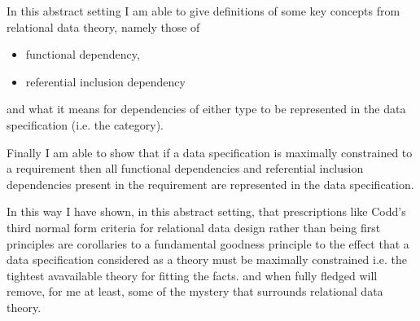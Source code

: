 \documentclass[10pt,a4paper]{article}
\theoremstyle{remark}
\begin{document}
In this abstract setting I am able to give definitions of some key concepts from relational data theory, namely
those of
\begin{itemize}
\item functional dependency,
\item referential inclusion dependency
\end{itemize}
and what it means for dependencies of either type to be represented in the data specification (i.e. the category).

Finally I am able to show that if a data specification is maximally constrained to a requirement then
all functional dependencies and referential inclusion dependencies present in the requirement are represented in the data
specification.

In this way I have shown,  in this abstract setting, that prescriptions like Codd's third normal form criteria 
for relational data design rather than being first principles are corollaries to a fundamental goodness principle to the effect that a data specification considered as a theory must be maximally constrained i.e. the tightest avavailable theory for fitting the facts.
 and when fully fledged will remove, for me at least, some of the mystery that surrounds  relational data theory. \\
\end{document}
